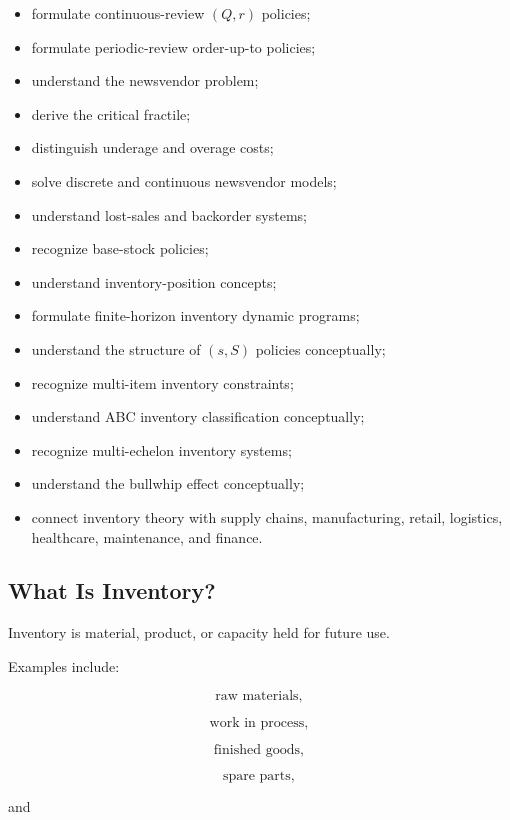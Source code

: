 {\begin{itemize}
    \item formulate continuous-review \((Q,r)\) policies;
    \item formulate periodic-review order-up-to policies;
    \item understand the newsvendor problem;
    \item derive the critical fractile;
    \item distinguish underage and overage costs;
    \item solve discrete and continuous newsvendor models;
    \item understand lost-sales and backorder systems;
    \item recognize base-stock policies;
    \item understand inventory-position concepts;
    \item formulate finite-horizon inventory dynamic programs;
    \item understand the structure of \((s,S)\) policies conceptually;
    \item recognize multi-item inventory constraints;
    \item understand ABC inventory classification conceptually;
    \item recognize multi-echelon inventory systems;
    \item understand the bullwhip effect conceptually;
    \item connect inventory theory with supply chains, manufacturing,
          retail, logistics, healthcare, maintenance, and finance.
\end{itemize}
}

\subsection{What Is Inventory?}
\label{subsec:what-is-inventory}

Inventory is material, product, or capacity held for future use.

Examples include:

\[
\boxed{
\text{raw materials},
}
\]

\[
\boxed{
\text{work in process},
}
\]

\[
\boxed{
\text{finished goods},
}
\]

\[
\boxed{
\text{spare parts},
}
\]

and

